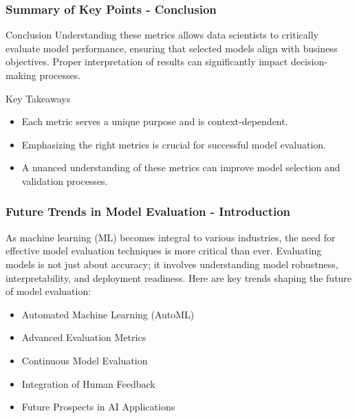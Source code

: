 \documentclass[aspectratio=169]{beamer}
\begin{document}
\begin{frame}[fragile]
    \frametitle{Summary of Key Points - Conclusion}
    \begin{block}{Conclusion}
        Understanding these metrics allows data scientists to critically evaluate model performance, ensuring that selected models align with business objectives. Proper interpretation of results can significantly impact decision-making processes.
    \end{block}

    \begin{block}{Key Takeaways}
        \begin{itemize}
            \item Each metric serves a unique purpose and is context-dependent.
            \item Emphasizing the right metrics is crucial for successful model evaluation.
            \item A nuanced understanding of these metrics can improve model selection and validation processes.
        \end{itemize}
    \end{block}
\end{frame}

\begin{frame}[fragile]
    \frametitle{Future Trends in Model Evaluation - Introduction}
    As machine learning (ML) becomes integral to various industries, the need for effective model evaluation techniques is more critical than ever. Evaluating models is not just about accuracy; it involves understanding model robustness, interpretability, and deployment readiness. Here are key trends shaping the future of model evaluation:
    \begin{itemize}
        \item Automated Machine Learning (AutoML)
        \item Advanced Evaluation Metrics
        \item Continuous Model Evaluation
        \item Integration of Human Feedback
        \item Future Prospects in AI Applications
    \end{itemize}
\end{frame}
\end{document}
